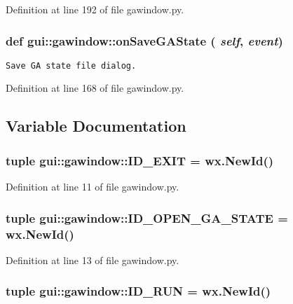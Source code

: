 Definition at line 192 of file gawindow.py.
\subsubsection{\setlength{\rightskip}{0pt plus 5cm}def gui::gawindow::onSaveGAState ( {\em self},  {\em event})}\label{namespacegui_1_1gawindow_6d0d90dd0c32c1e82849e95e4ca21b62}




\footnotesize\begin{verbatim}
Save GA state file dialog.
\end{verbatim}
\normalsize
 

Definition at line 168 of file gawindow.py.

\subsection{Variable Documentation}
\subsubsection{\setlength{\rightskip}{0pt plus 5cm}tuple {\bf gui::gawindow::ID\_\-EXIT} = wx.NewId()\hspace{0.3cm}{\tt  [static]}}\label{namespacegui_1_1gawindow_8db0c469b4d603e5505c226a7daecc18}




Definition at line 11 of file gawindow.py.
\subsubsection{\setlength{\rightskip}{0pt plus 5cm}tuple {\bf gui::gawindow::ID\_\-OPEN\_\-GA\_\-STATE} = wx.NewId()\hspace{0.3cm}{\tt  [static]}}\label{namespacegui_1_1gawindow_72681e0f08c4673e9f78f317487b5ca7}




Definition at line 13 of file gawindow.py.
\subsubsection{\setlength{\rightskip}{0pt plus 5cm}tuple {\bf gui::gawindow::ID\_\-RUN} = wx.NewId()\hspace{0.3cm}{\tt  [static]}}\label{namespacegui_1_1gawindow_416b8bd31f6d9ce8e395304906a4f12e}




